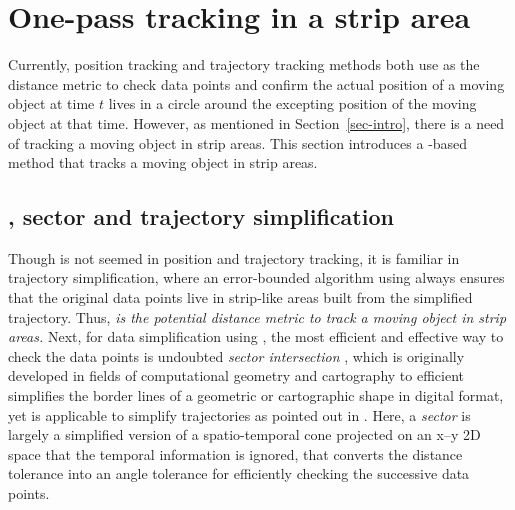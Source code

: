 

\section{One-pass tracking in a strip area}
\label{sec:strip}


Currently, position tracking and trajectory tracking methods both use \sed as the distance metric to check data points and confirm the actual position of a moving object at time $t$ lives in a circle around the excepting position of the moving object at that time.
However, as mentioned in Section~\ref{sec-intro}, there is a need of tracking a moving object in strip areas.
This section introduces a \ped-based method that tracks a moving object in strip areas.


  

\subsection{\ped, sector and trajectory simplification}
\label{sec:sector-in-simp}

Though \ped is not seemed in position and trajectory tracking, it is familiar in trajectory simplification, where an error-bounded algorithm using \ped always ensures that the original data points live in strip-like areas built from the simplified trajectory. 
Thus, \textit{\ped is the potential distance metric to track a moving object in strip areas.}
%
Next, for data simplification using \ped, the most efficient and effective way to check the data points is undoubted \textit{sector intersection} \cite{Williams:Longest, Sklansky:Cone, Dunham:Cone, Zhao:Sleeve}, which is originally developed in fields of computational geometry and cartography to efficient simplifies the border lines of a geometric or cartographic shape in digital format, yet is applicable to simplify trajectories as pointed out in \cite{Lin:Cised}. Here, a \emph{sector} is largely a simplified version of a spatio-temporal cone projected on an x--y 2D space that the temporal information is ignored, that converts the \ped distance tolerance into an angle tolerance for efficiently checking the successive data points.

